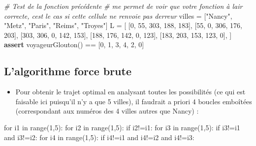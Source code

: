 \documentclass[
  paper=a4,
  ,captions=tableheading
]{scrartcl}
\newenvironment{Shaded}{}{}
\newcommand{\CommentTok}[1]{\textcolor[rgb]{0.38,0.63,0.69}{\textit{#1}}}
\newcommand{\ControlFlowTok}[1]{\textcolor[rgb]{0.00,0.44,0.13}{\textbf{#1}}}
\newcommand{\DecValTok}[1]{\textcolor[rgb]{0.25,0.63,0.44}{#1}}
\newcommand{\NormalTok}[1]{#1}
\newcommand{\OperatorTok}[1]{\textcolor[rgb]{0.40,0.40,0.40}{#1}}
\newcommand{\StringTok}[1]{\textcolor[rgb]{0.25,0.44,0.63}{#1}}
\providecommand{\tightlist}{%
  \setlength{\itemsep}{0pt}\setlength{\parskip}{0pt}}
\begin{document}
\begin{Shaded}
\begin{Highlighting}[]
\CommentTok{\# Test de la fonction précédente}
\CommentTok{\# me permet de voir que votre fonction à l\textquotesingle{}air correcte, c\textquotesingle{}est le cas si cette cellule ne renvoie pas d\textquotesingle{}erreur}
\NormalTok{villes }\OperatorTok{=}\NormalTok{ [}\StringTok{"Nancy"}\NormalTok{, }\StringTok{"Metz"}\NormalTok{, }\StringTok{"Paris"}\NormalTok{, }\StringTok{"Reims"}\NormalTok{, }\StringTok{"Troyes"}\NormalTok{]}
\NormalTok{L }\OperatorTok{=}\NormalTok{ [}
\NormalTok{    [}\DecValTok{0}\NormalTok{, }\DecValTok{55}\NormalTok{, }\DecValTok{303}\NormalTok{, }\DecValTok{188}\NormalTok{, }\DecValTok{183}\NormalTok{],}
\NormalTok{    [}\DecValTok{55}\NormalTok{, }\DecValTok{0}\NormalTok{, }\DecValTok{306}\NormalTok{, }\DecValTok{176}\NormalTok{, }\DecValTok{203}\NormalTok{],}
\NormalTok{    [}\DecValTok{303}\NormalTok{, }\DecValTok{306}\NormalTok{, }\DecValTok{0}\NormalTok{, }\DecValTok{142}\NormalTok{, }\DecValTok{153}\NormalTok{],}
\NormalTok{    [}\DecValTok{188}\NormalTok{, }\DecValTok{176}\NormalTok{, }\DecValTok{142}\NormalTok{, }\DecValTok{0}\NormalTok{, }\DecValTok{123}\NormalTok{],}
\NormalTok{    [}\DecValTok{183}\NormalTok{, }\DecValTok{203}\NormalTok{, }\DecValTok{153}\NormalTok{, }\DecValTok{123}\NormalTok{, }\DecValTok{0}\NormalTok{],}
\NormalTok{]}
\ControlFlowTok{assert}\NormalTok{ voyageurGlouton() }\OperatorTok{==}\NormalTok{ [}\DecValTok{0}\NormalTok{, }\DecValTok{1}\NormalTok{, }\DecValTok{3}\NormalTok{, }\DecValTok{4}\NormalTok{, }\DecValTok{2}\NormalTok{, }\DecValTok{0}\NormalTok{]}
\end{Highlighting}
\end{Shaded}

\hypertarget{lalgorithme-force-brute}{%
\subsection{L'algorithme force brute}\label{lalgorithme-force-brute}}

\begin{itemize}
\tightlist
\item
  Pour obtenir le trajet optimal en analysant toutes les possibilités
  (ce qui est faisable ici puisqu'il n'y a que 5 villes), il faudrait a
  priori 4 boucles emboîtées (correspondant aux numéros des 4 villes
  autres que Nancy) :
\end{itemize}

\begin{Shaded}
\begin{Highlighting}[]
\NormalTok{for i1 in range(1,5):}
\NormalTok{    for i2 in range(1,5):}
\NormalTok{        if i2!=i1:}
\NormalTok{            for i3 in range(1,5):}
\NormalTok{                if i3!=i1 and i3!=i2:}
\NormalTok{                    for i4 in range(1,5):}
\NormalTok{                        if i4!=i1 and i4!=i2 and i4!=i3:}
\end{Highlighting}
\end{Shaded}
\end{document}
